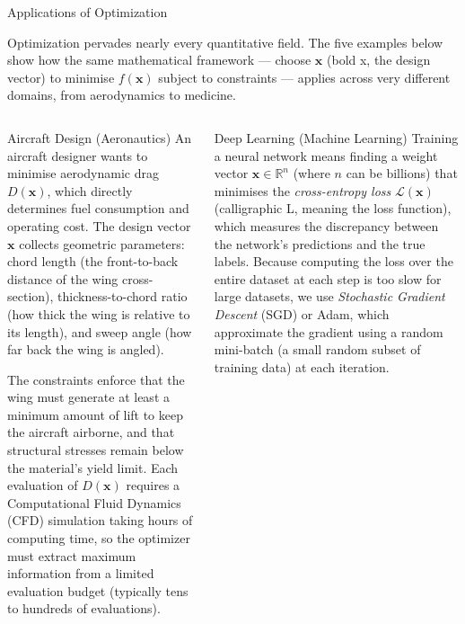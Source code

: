 \documentclass[aspectratio=169,10pt]{beamer}
\newcommand{\vx}{\mathbf{x}}
\newcommand{\R}{\mathbb{R}}
\begin{document}
\begin{frame}[allowframebreaks]{Applications of Optimization}

Optimization pervades nearly every quantitative field.  The five examples
below show how the same mathematical framework --- choose $\vx$ (bold x, the
design vector) to minimise $f(\vx)$ subject to constraints --- applies across
very different domains, from aerodynamics to medicine.

  \begin{columns}[T]

      \begin{block}{Aircraft Design (Aeronautics)}
        An aircraft designer wants to minimise aerodynamic drag $D(\vx)$,
        which directly determines fuel consumption and operating cost.
        The design vector $\vx$ collects geometric parameters: chord length
        (the front-to-back distance of the wing cross-section), thickness-to-chord
        ratio (how thick the wing is relative to its length), and sweep angle
        (how far back the wing is angled).

        \medskip
        The constraints enforce that the wing must generate at least a minimum
        amount of lift to keep the aircraft airborne, and that structural stresses
        remain below the material's yield limit.  Each evaluation of $D(\vx)$
        requires a Computational Fluid Dynamics (CFD) simulation taking hours of
        computing time, so the optimizer must extract maximum information from a
        limited evaluation budget (typically tens to hundreds of evaluations).
      \end{block}

      \vspace{0.4em}

      \begin{block}{Deep Learning (Machine Learning)}
        Training a neural network means finding a weight vector $\vx \in \R^n$
        (where $n$ can be billions) that minimises the \emph{cross-entropy loss}
        $\mathcal{L}(\vx)$ (calligraphic L, meaning the loss function), which
        measures the discrepancy between the network's predictions and the true
        labels.  Because computing the loss over the entire dataset at each step
        is too slow for large datasets, we use \emph{Stochastic Gradient Descent}
        (SGD) or Adam, which approximate the gradient using a random mini-batch
        (a small random subset of training data) at each iteration.
      \end{block}


\end{columns}
\end{frame}
\end{document}
